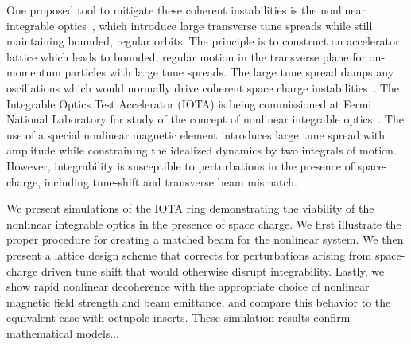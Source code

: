 \documentclass[aps,prstab,twocolumn, groupedaddress]{revtex4-1}
\begin{document}
One proposed tool to mitigate these coherent instabilities is the nonlinear integrable optics~\cite{danilovNagaitsev:2010, nagValDan:2010}, which introduce large transverse tune spreads while still maintaining bounded, regular orbits. The principle is to construct an accelerator lattice which leads to bounded, regular motion in the transverse plane for on-momentum particles with large tune spreads. The large tune spread damps any oscillations which would normally drive coherent space charge instabilities~\cite{webb:12}. The Integrable Optics Test Accelerator (IOTA) is being commissioned at Fermi National Laboratory for study of the concept of nonlinear integrable optics~\cite{IOTA_techreport}. The use of a special nonlinear magnetic element introduces large tune spread with amplitude while constraining the idealized dynamics by two integrals of motion. However, integrability is susceptible to perturbations in the presence of space-charge, including tune-shift and transverse beam mismatch.

We present simulations of the IOTA ring demonstrating the viability of the nonlinear integrable optics in the presence of space charge. We first illustrate the proper procedure for creating a matched beam for the nonlinear system. We then present a lattice design scheme that corrects for perturbations arising from space-charge driven tune shift that would otherwise disrupt integrability. Lastly, we show rapid nonlinear decoherence with the appropriate choice of nonlinear magnetic field strength and beam emittance, and compare this behavior to the equivalent case with octupole inserts. These simulation results confirm mathematical models... 


\end{document}
